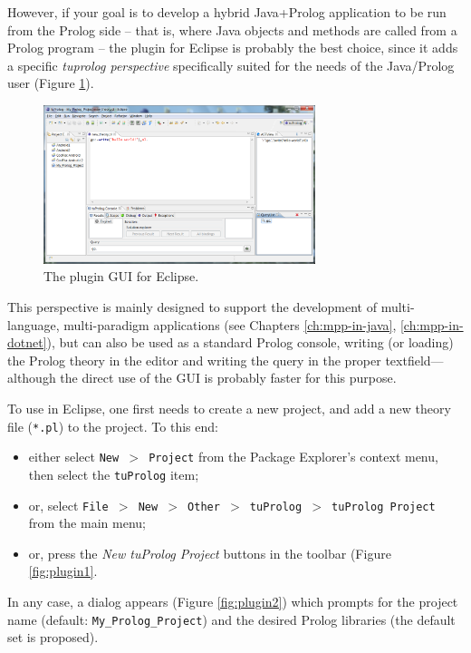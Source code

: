 However, if your goal is to develop a hybrid Java+Prolog application to be run from the Prolog side -- that is, where Java objects and methods are called from a Prolog program -- the \tuprolog{} plugin for Eclipse is probably the best choice, since it adds a specific \textit{tuprolog perspective} specifically suited for the needs of the Java/Prolog user (Figure \ref{fig:tuprologPluginGUI}).

\begin{figure}
\centering
  \includegraphics[width=300px]{images/tuprologPluginGUI.png}
  \caption{The \tuprolog{} plugin GUI for Eclipse.}\label{fig:tuprologPluginGUI}
\end{figure}

This perspective is mainly designed to support the development of multi-language, multi-paradigm applications (see Chapters \ref{ch:mpp-in-java}, \ref{ch:mpp-in-dotnet}), but can also be used as a standard Prolog console, writing (or loading) the Prolog theory in the editor and writing the query in the proper textfield---although the direct use of the \tuprolog{} GUI is probably faster for this purpose.

To use \tuprolog{} in Eclipse, one first needs to create a new \tuprolog{} project, and add a new theory file (\texttt{*.pl}) to the project.
%
To this end:%
\begin{itemize}
  \item either select \texttt{New $>$ Project} from the Package Explorer's context menu, then select the \texttt{tuProlog} item;
  \item or, select \texttt{File $>$ New $>$ Other $>$ tuProlog $>$ tuProlog Project} from the main menu;
  \item or, press the \textit{New tuProlog Project} buttons in the \tuprolog{} toolbar (Figure \ref{fig:plugin1}.
\end{itemize}

In any case, a dialog appears (Figure \ref{fig:plugin2}) which prompts for the project name (default: \texttt{My\_Prolog\_Project}) and the desired Prolog libraries (the default set is proposed).

